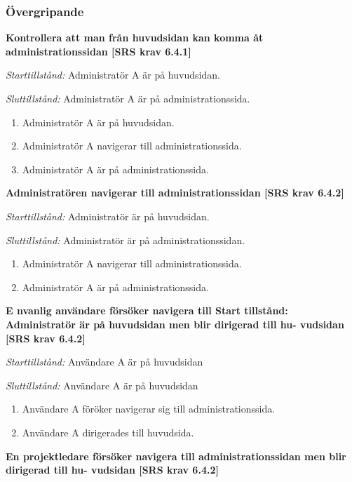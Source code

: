 \documentclass[a4paper]{article}
\begin{document}
\subsubsection{Övergripande}
\begin{FT}
\item %
\textbf{Kontrollera att man från huvudsidan kan komma åt administrationssidan [SRS krav 6.4.1]}

\emph{Starttillstånd:}  Administratör A är på huvudsidan.

\emph{Sluttillstånd:} Administratör A är på administrationssida.

\begin{enumerate}
\item Administratör A är på huvudsidan.
\item Administratör A navigerar till administrationssida.
\item Administratör A är på administrationssida. 
\end{enumerate}

\item %
\textbf{Administratören navigerar till administrationssidan [SRS krav 6.4.2]}

\emph{Starttillstånd:} Administratör är på huvudsidan.

\emph{Sluttillstånd:} Administratör är på administrationssidan.

\begin{enumerate}
\item Administratör A navigerar till administrationssida.
\item Administratör A är på administrationssida.
\end{enumerate}

\item %
\textbf{E nvanlig användare försöker navigera till Start tillstånd: Administratör är på huvudsidan men blir dirigerad till hu- vudsidan [SRS krav 6.4.2]}

\emph{Starttillstånd:} Användare A är på huvudsidan

\emph{Sluttillstånd:} Användare A är på huvudsidan

\begin{enumerate}
\item Användare A föröker navigerar sig  till administrationssida.
\item Användare A dirigerades till huvudsida. 
\end{enumerate}

\item %
\textbf{En projektledare försöker navigera till administrationssidan men blir dirigerad till hu- vudsidan [SRS krav 6.4.2]}


\end{FT}
\end{document}
